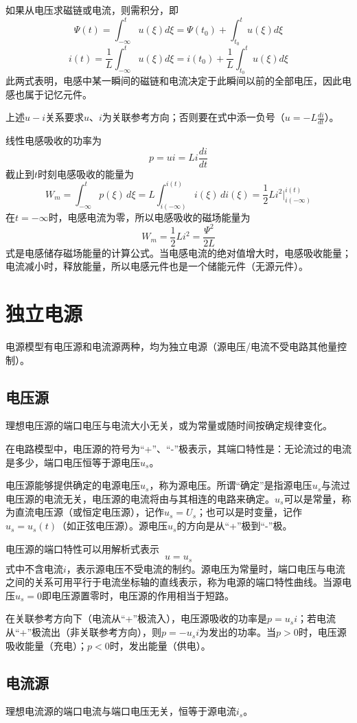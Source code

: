 如果从电压求磁链或电流，则需积分，即
\[
\Psi(t)=\int_{-∞}^tu(\xi)d\xi=\Psi(t_0)+\int_{t_0}^tu(\xi)d\xi
\]
\[
i(t)=\frac{1}{L}\int_{-∞}^tu(\xi)d\xi=i(t_0)+\frac{1}{L}\int_{t_0}^tu(\xi)d\xi
\]
此两式表明，电感中某一瞬间的磁链和电流决定于此瞬间以前的全部电压，因此电感也属于记忆元件。

上述$u-i$关系要求$u\text{、}i$为关联参考方向；否则要在式中添一负号（$u=-L\frac{di}{dt}$）。

线性电感吸收的功率为
\[
p=ui=Li\frac{di}{dt}
\]
截止到$t$时刻电感吸收的能量为
\[
W_m = \int_{-\infty}^{t} p(\xi) \, d\xi = L \int_{i(-\infty)}^{i(t)} i(\xi) \, di(\xi) = \frac{1}{2} L i^2 \bigg|_{i(-\infty)}^{i(t)}
\]
在$t=-∞$时，电感电流为零，所以电感吸收的磁场能量为
\[
W_m=\frac{1}{2}Li^2=\frac{\Psi^2}{2L}
\]
式是电感储存磁场能量的计算公式。当电感电流的绝对值增大时，电感吸收能量；电流减小时，释放能量，所以电感元件也是一个储能元件（无源元件）。

\section{独立电源}
电源模型有电压源和电流源两种，均为独立电源（源电压/电流不受电路其他量控制）。

\subsection{电压源}
理想电压源的端口电压与电流大小无关，或为常量或随时间按确定规律变化。

在电路模型中，电压源的符号为“+”、“-”极表示，其端口特性是：无论流过的电流是多少，端口电压恒等于源电压$u_s$。

电压源能够提供确定的电源电压$u_s$，称为源电压。所谓“确定”是指源电压$u_s$与流过电压源的电流无关，电压源的电流将由与其相连的电路来确定。$u_s$可以是常量，称为直流电压源（或恒定电压源），记作$u_s=U_s$；也可以是时变量，记作$u_s=u_s(t)$（如正弦电压源）。源电压$u_s$的方向是从“+”极到“-”极。

电压源的端口特性可以用解析式表示
\[
u=u_s
\]
式中不含电流$i$，表示源电压不受电流的制约。源电压为常量时，端口电压与电流之间的关系可用平行于电流坐标轴的直线表示，称为电源的端口特性曲线。当源电压$u_s=0$即电压源置零时，电压源的作用相当于短路。

在关联参考方向下（电流从“+”极流入），电压源吸收的功率是$p=u_si$；若电流从“+”极流出（非关联参考方向），则$p=-u_si$为发出的功率。当$p>0$时，电压源吸收能量（充电）；$p<0$时，发出能量（供电）。

\subsection{电流源}
理想电流源的端口电流与端口电压无关，恒等于源电流$i_s$。

